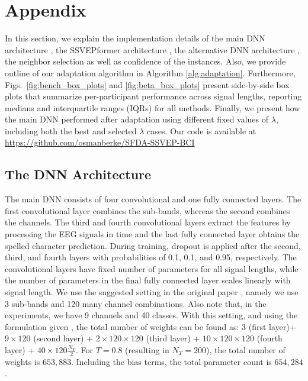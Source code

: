 \documentclass[12pt]{iopart}
\begin{document}
\section*{Appendix}
In this section, we explain the implementation details of the main DNN architecture \cite{ournetwork}, {the SSVEPformer architecture \cite{ssvepformer}, } the alternative DNN architecture \cite{another_network}, the neighbor selection as well as confidence of the instances. Also, we provide outline of our adaptation algorithm in Algorithm \ref{alg:adaptation}. {Furthermore, Figs.~\ref{fig:bench_box_plots} and \ref{fig:beta_box_plots} present side-by-side box plots that summarize per-participant performance across signal lengths, reporting medians and interquartile ranges (IQRs) for all methods.} Finally, we present how the main DNN \cite{ournetwork} performed after adaptation using different fixed values of $\lambda$, including both the best and selected $\lambda$ cases. Our code is available at 
\url{https://github.com/osmanberke/SFDA-SSVEP-BCI}

\subsection{The DNN Architecture}
The main DNN \cite{ournetwork} consists of four convolutional and one fully connected layers. The first convolutional layer combines the sub-bands, whereas the second combines the channels. The third and fourth convolutional layers extract the features by processing the EEG signals in time and the last fully connected layer obtains the spelled character prediction. During training, dropout \cite{dropout_paper} is applied after the second, third, and fourth layers with probabilities of 0.1, 0.1, and 0.95, respectively. The convolutional layers have fixed number of parameters for all signal lengths, while the number of parameters in the final fully connected layer scales linearly with signal length. We use the suggested setting in the original paper \cite{ournetwork}, namely we use 3 sub-bands and 120 many channel combinations. Also note that, in the experiments, we have 9 channels and 40 classes. With this setting, and using the formulation given \cite{ournetwork}, the total number of weights can be found as: $3$ (first layer)+ $9\times120$ (second layer) + $2\times120\times120$ (third layer) + $10\times120\times120$ (fourth layer) + $40\times120\frac{N_T}{2}$. For $T=0.8$ (resulting in $N_T = 200$), the total number of weights is $653,883$. Including the bias terms, the total parameter count is $654,284$.
\end{document}
